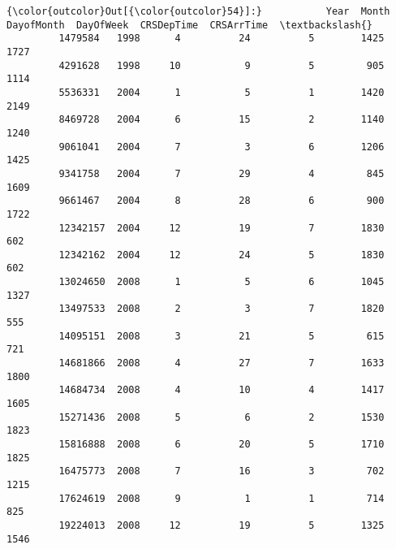 \documentclass[11pt]{article}
\begin{document}
\begin{Verbatim}[commandchars=\\\{\}]
{\color{outcolor}Out[{\color{outcolor}54}]:}           Year  Month  DayofMonth  DayOfWeek  CRSDepTime  CRSArrTime  \textbackslash{}
         1479584   1998      4          24          5        1425        1727   
         4291628   1998     10           9          5         905        1114   
         5536331   2004      1           5          1        1420        2149   
         8469728   2004      6          15          2        1140        1240   
         9061041   2004      7           3          6        1206        1425   
         9341758   2004      7          29          4         845        1609   
         9661467   2004      8          28          6         900        1722   
         12342157  2004     12          19          7        1830         602   
         12342162  2004     12          24          5        1830         602   
         13024650  2008      1           5          6        1045        1327   
         13497533  2008      2           3          7        1820         555   
         14095151  2008      3          21          5         615         721   
         14681866  2008      4          27          7        1633        1800   
         14684734  2008      4          10          4        1417        1605   
         15271436  2008      5           6          2        1530        1823   
         15816888  2008      6          20          5        1710        1825   
         16475773  2008      7          16          3         702        1215   
         17624619  2008      9           1          1         714         825   
         19224013  2008     12          19          5        1325        1546   
         

\end{Verbatim}
\end{document}
